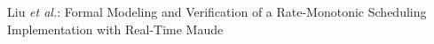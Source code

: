 \documentclass[10pt,journal,compsoc]{IEEEtran}
\begin{document}
% 
%



%
{Liu \MakeLowercase{\textit{et al.}}: Formal Modeling and Verification of a Rate-Monotonic Scheduling Implementation with Real-Time Maude}
% 



\end{document}
